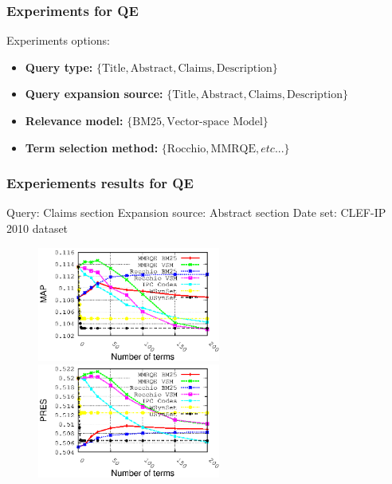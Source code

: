 \documentclass[xcolor=x11names,compress]{beamer}
\renewcommand{\(}{\begin{columns}}
\renewcommand{\)}{\end{columns}}
\newcommand{\<}[1]{\begin{column}{#1}}
\renewcommand{\>}{\end{column}}
\begin{document}
\begin{frame}
\frametitle{Experiments for QE}

Experiments options:

\begin{itemize}
\item \textbf{\footnotesize{}Query type:}{\footnotesize{} $\{\mathrm{Title},\mathrm{Abstract},\mathrm{Claims},\mathrm{Description}\}$ }{\footnotesize \par}
\item \textbf{\footnotesize{}Query expansion source:}{\footnotesize{} $\{\mathrm{Title},\mathrm{Abstract},\mathrm{Claims},\mathrm{Description}\}$ }{\footnotesize \par}
\item \textbf{\footnotesize{}Relevance model:}{\footnotesize{} $\{\mathrm{BM25},\mbox{Vector-space Model}\}$ }{\footnotesize \par}
\item \textbf{\footnotesize{}Term selection method:}{\footnotesize{} $\{\mathrm{Rocchio},\mathrm{MMRQE},etc...\}$ }{\footnotesize \par}
\end{itemize}
\end{frame}




\begin{frame}
\frametitle{Experiements results for QE}

Query: Claims section
Expansion source: Abstract section
Date set: CLEF-IP 2010 dataset

\begin{center}
\begin{figure}
\begin{centering}
\includegraphics[width=6cm]{../Results-CIKM2014/qClaims-sAbstract_MAP_2010}\includegraphics[width=6cm]{../Results-CIKM2014/qClaims-sAbstract_PRES_2010}
\par\end{centering}

\end{figure}
\par\end{center}
\end{frame}
\end{document}
